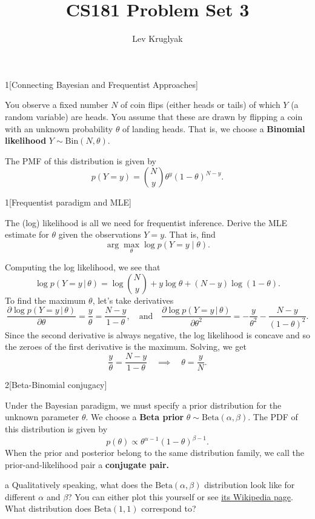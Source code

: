 \documentclass[expanded]{lkx_pset}
\title{CS181 Problem Set 3}
\author{Lev Kruglyak}
\begin{document}
\maketitle

\begin{problem}{1}[Connecting Bayesian and Frequentist Approaches]
\end{problem}

\begin{solution}
	You observe a fixed number \(N\) of coin flips (either
	heads or tails) of which \(Y\) (a random variable) are heads. You assume that these are drawn by flipping a coin with an unknown probability \(\theta\) of
	landing heads. That is, we choose a \textbf{Binomial likelihood}
	\(Y \sim \mathrm{Bin}(N, \theta)\).

	The PMF of this distribution is given by
	\[
		p(Y=y) = {\binom{N}{y}} \theta^{y} (1-\theta)^{N-y}.
	\]
	\begin{part}{1}[Frequentist paradigm and MLE]
	\end{part}
	\begin{parts}
		\begin{part}{}
			The (log) likelihood is all we need for frequentist inference. Derive the MLE estimate for \(\theta\) given the observations \(Y = y\). That is, find \[\arg \max_{\theta} \log p(Y = y \mid \theta).\]
		\end{part}

		Computing the log likelihood, we see that
		\[
			\log p(Y = y \,|\, \theta) = \log\binom{N}{y}+y\log\theta + (N-y)\log(1-\theta).
		\]
		To find the maximum $\theta$, let's take derivatives
		\[
			\frac{\partial \log p(Y=y \,|\, \theta)}{\partial \theta} = \frac{y}{\theta}=\frac{N-y}{1-\theta},\quad\textrm{and}\quad \frac{\partial \log p(Y=y\,|\, \theta)}{\partial \theta^2} = -\frac{y}{\theta^2}-\frac{N-y}{(1-\theta)^2}.
		\]
		Since the second derivative is always negative, the log likelihood is concave and so the zeroes of the first derivative is the maximum. Solving, we get
		\[
			\frac{y}{\theta} = \frac{N-y}{1-\theta} \quad\implies\quad \theta =\frac{y}{N}.
		\]
	\end{parts}

	\begin{part}{2}[Beta-Binomial conjugacy]
	\end{part}
	\begin{solution}
		Under the Bayesian paradigm, we must specify a prior distribution for the unknown parameter $\theta$. We choose a \textbf{Beta prior} $\theta\sim \mathrm{Beta}(\alpha, \beta)$. The PDF of this distribution is given by
		\[
			p(\theta) \propto \theta^{\alpha -1} (1-\theta)^{\beta - 1}.
		\]
		When the prior and posterior belong to the same distribution family, we
		call the prior-and-likelihood pair a \textbf{conjugate pair.}
		\begin{part}{a}
			Qualitatively speaking, what does the $\mathrm{Beta}(\alpha, \beta)$ distribution look like for different $\alpha$ and $\beta$? You can either plot this yourself or see \href{https://en.wikipedia.org/wiki/Beta_distribution}{its Wikipedia page}. What distribution does $\mathrm{Beta}(1, 1)$ correspond to?
		\end{part}


\end{solution}
\end{solution}
\end{document}
